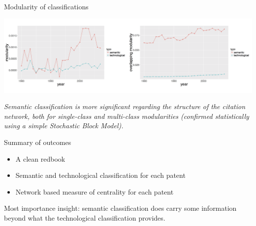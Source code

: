 \documentclass{beamer}
\begin{document}
\begin{frame}{Modularity of classifications} \label{slide:modularity}
\hyperlink{slide:modularity_def}{}

   \centering
    \includegraphics[width=\textwidth]{figures/Fig9.png}
    
    \medskip
    
    \textit{Semantic classification is more significant regarding the structure of the citation network, both for single-class and multi-class modularities (confirmed statistically using a simple Stochastic Block Model).}
    
\end{frame}




\begin{frame}{Summary of outcomes}
    \begin{itemize}
        \item A clean redbook
        \item Semantic and technological classification for each patent
        \item Network based measure of centrality for each patent
    \end{itemize}
    
    Most importance insight: semantic classification does carry some information beyond what the technological classification provides.
\end{frame}
\end{document}
